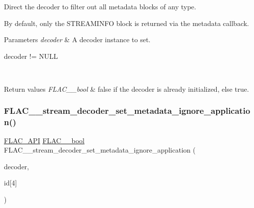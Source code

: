 Direct the decoder to filter out all metadata blocks of any type.

By default, only the {\ttfamily S\+T\+R\+E\+A\+M\+I\+N\+FO} block is returned via the metadata callback. 
\begin{DoxyParams}{Parameters}
{\em decoder} & A decoder instance to set.  
\begin{DoxyCode}
decoder != NULL 
\end{DoxyCode}
 \\
\hline
\end{DoxyParams}

\begin{DoxyRetVals}{Return values}
{\em F\+L\+A\+C\+\_\+\+\_\+bool} & {\ttfamily false} if the decoder is already initialized, else {\ttfamily true}. \\
\hline
\end{DoxyRetVals}
\mbox{\label{group__flac__stream__decoder_gac5eb8b3cb8df3afe788046317fbe9fb6}} 
\subsubsection{\texorpdfstring{F\+L\+A\+C\+\_\+\+\_\+stream\+\_\+decoder\+\_\+set\+\_\+metadata\+\_\+ignore\+\_\+application()}{FLAC\_\_stream\_decoder\_set\_metadata\_ignore\_application()}}
{\footnotesize\ttfamily \hyperlink{group__flac__export_ga56ca07df8a23310707732b1c0007d6f5}{F\+L\+A\+C\+\_\+\+A\+PI} \hyperlink{ordinals_8h_a95103469f1cbd78b8cf250194985b34e}{F\+L\+A\+C\+\_\+\+\_\+bool} F\+L\+A\+C\+\_\+\+\_\+stream\+\_\+decoder\+\_\+set\+\_\+metadata\+\_\+ignore\+\_\+application (\begin{DoxyParamCaption}\item[{\hyperlink{struct_f_l_a_c_____stream_decoder}{F\+L\+A\+C\+\_\+\+\_\+\+Stream\+Decoder} $\ast$}]{decoder,  }\item[{\hyperlink{zconf_8h_a2c212835823e3c54a8ab6d95c652660e}{const} \hyperlink{ordinals_8h_a5eb569b12d5b047cdacada4d57924ee3}{F\+L\+A\+C\+\_\+\+\_\+byte}}]{id\mbox{[}4\mbox{]} }\end{DoxyParamCaption})}

